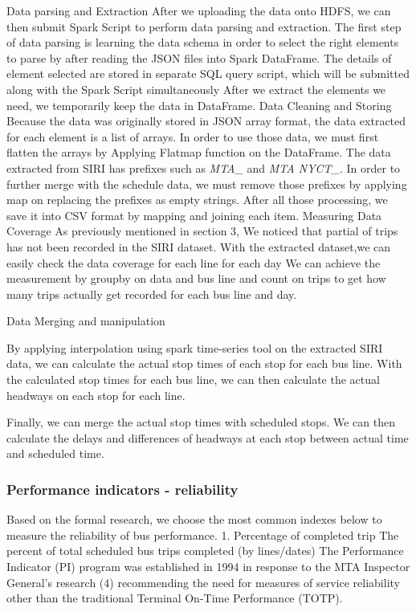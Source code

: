 \documentclass[12pt,journal,compsoc]{IEEEtran}
\begin{document}
Data parsing and Extraction
After we uploading the data onto HDFS, we can then submit Spark Script to perform data parsing and extraction.
The first step of data parsing is learning the data schema in order to select the right elements to parse by after  reading the JSON files into Spark DataFrame.
The details of element selected are stored in separate SQL query script, which will be submitted along with the Spark Script simultaneously
After we extract the elements we need, we temporarily keep the data in DataFrame.
Data Cleaning and Storing
Because the data was originally stored in JSON array format, the data extracted for each element is a list of arrays. In order to use those data, we must first flatten the arrays by Applying Flatmap function on the DataFrame.
The data extracted from SIRI has prefixes such as \textit{MTA\_} and \textit{MTA NYCT\_}. In order to further merge with the schedule data, we must remove those prefixes by applying map on replacing the prefixes as empty strings.
After all those processing, we save it into CSV format by mapping and joining each item.
Measuring Data Coverage
As previously mentioned in section 3, We noticed that partial of trips has not been recorded in the SIRI dataset. With the extracted dataset,we can easily check the data coverage for each line for each day
We can achieve the measurement by groupby on data and bus line and count on trips to get how many trips actually get recorded for each bus line and day. 

Data Merging and manipulation

By applying interpolation using spark time-series tool on the extracted SIRI data, we can calculate the actual stop times of each stop for each bus line. With the calculated stop times for each bus line, we can then calculate the actual headways on each stop for each line. 
 
Finally, we can merge the actual stop times with scheduled stops. We can then calculate the delays and differences of headways at each stop between actual time and scheduled time. 

\subsubsection{Performance indicators - reliability}

Based on the formal research, we choose the most common indexes below to measure the reliability of bus performance.
1. Percentage of completed trip
The percent of total scheduled bus trips completed (by lines/dates)
The Performance Indicator (PI) program was established in 1994 in response to the MTA Inspector General’s research (4) recommending the need for measures of service reliability other than the traditional Terminal On-Time Performance (TOTP). 
\end{document}
